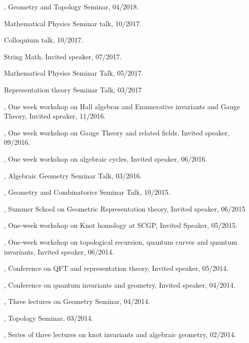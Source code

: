 \documentclass[11pt]{amsart}
\theoremstyle{plain}
\theoremstyle{definition}
\theoremstyle{remark}
\begin{document}
, Geometry and  Topology Seminar, 04/2018.

 Mathematical Physics Seminar talk, 10/2017.

 Colloquium talk, 10/2017.

 String Math, Invited speaker, 07/2017.

 Mathematical Physics Seminar Talk, 05/2017.

 Representation theory Seminar Talk, 03/2017

, One week workshop on Hall algebras and Enumerative invariants and Gauge Theory, Invited speaker, 11/2016.

, One week workshop on Gauge Theory and related fields, Invited speaker, 09/2016.

, One week workshop on algebraic cycles, Invited speaker, 06/2016.

, Algebraic Geometry Seminar Talk, 03/2016.


, Geometry and Combinatorics Seminar Talk, 10/2015.

, Summer School on Geometric Representation theory, Invited speaker, 06/2015

, One-week workshop on Knot homology at SCGP, Invited Speaker, 05/2015. 

,  One-week workshop on topological recursion, quantum curves and quantum invariants, Invited speaker, 06/2014. 

, Conference on QFT and representation theory, Invited speaker, 05/2014.

, Conference on quantum invariants and geometry, Invited speaker, 04/2014.

, Three lectures on Geometry Seminar, 04/2014.

, Topology Seminar, 03/2014.

, Series of three lectures on knot invariants and algebraic geometry, 02/2014.
\end{document}
